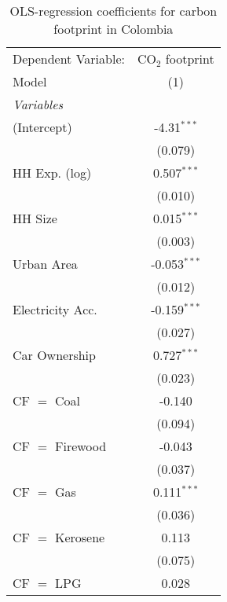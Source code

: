
\begin{table}[htbp!]
   \centering
   \small
   \begin{adjustbox}{width = 1\textwidth, max height = 0.95\textheight, center}
      \begin{threeparttable}[b]
         \caption{\label{tab:OLS_2_COL} OLS-regression coefficients for carbon footprint in Colombia}
         \begin{tabular}{lc}
            \tabularnewline \midrule \midrule
            Dependent Variable: & CO$_{2}$ footprint\\  
            Model               & (1)\\  
            \midrule
            \emph{Variables}\\
            (Intercept)         & -4.31$^{***}$\\   
                                & (0.079)\\   
            HH Exp. (log)       & 0.507$^{***}$\\   
                                & (0.010)\\   
            HH Size             & 0.015$^{***}$\\   
                                & (0.003)\\   
            Urban Area          & -0.053$^{***}$\\   
                                & (0.012)\\   
            Electricity Acc.    & -0.159$^{***}$\\   
                                & (0.027)\\   
            Car Ownership       & 0.727$^{***}$\\   
                                & (0.023)\\   
            CF $=$ Coal         & -0.140\\   
                                & (0.094)\\   
            CF $=$ Firewood     & -0.043\\   
                                & (0.037)\\   
            CF $=$ Gas          & 0.111$^{***}$\\   
                                & (0.036)\\   
            CF $=$ Kerosene     & 0.113\\   
                                & (0.075)\\   
            CF $=$ LPG          & 0.028\\   

\end{tabular}
\end{threeparttable}
\end{adjustbox}
\end{table}
